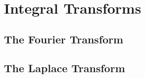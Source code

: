 \section{Integral Transforms}

\subsection{The Fourier Transform}


\subsection{The Laplace Transform}


\begin{comment}

-Fourier and Laplace Transform
 -can be seen as linear integral operators that take a function to another function
  ...i think, it operates on the space of square-integrable functions and produces square integrable
  functions as output, too?

https://en.wikipedia.org/wiki/List_of_Fourier-related_transforms
https://en.wikipedia.org/wiki/List_of_transforms


https://en.wikipedia.org/wiki/Hartley_transform
https://en.wikipedia.org/wiki/Hilbert_transform
https://en.wikipedia.org/wiki/Mellin_transform
https://en.wikipedia.org/wiki/Gabor_transform

what about wavelet transform? Morlet

eigenfuncs of fourier-trafo:
http://www.systems.caltech.edu/dsp/ppv/papers/journal08post/PPVIETEeigenFT.pdf
https://www.tandfonline.com/doi/abs/10.1080/09747338.2008.11673800?journalCode=tije20

-Radon transform


The Fourier Transform on L2 - What they don't tell you
https://www.youtube.com/watch?v=etZy8a32kcc
-Hermite functions are eigenfunctions of Fourier transform (they are an eigenbasis)

See also:
https://en.wikipedia.org/wiki/Hermitian_wavelet
https://en.wikipedia.org/wiki/Hermite_transform
https://en.wikipedia.org/wiki/Hermite_polynomials
https://mathphys.uva.es/files/2020/07/CelGadOlmo_0720.pdf  Hermite functions and Fourier series

I think, the Hermite polynomials can be obtained from successively differentiating 
f(x) = e^(-x^2). See the following SageMath code:

f0 = exp(-x^2)
f1 = diff(f0, x)
f2 = diff(f1, x)
f3 = diff(f2, x)
f4 = diff(f3, x)
f5 = diff(f4, x)
f0, f1, f2, f3, f4, f5

The result is always some polynomial times e^(-x^2). Although, the actualy Hermite polynomials seem
to have different signs in the coefficients.

\end{comment} 